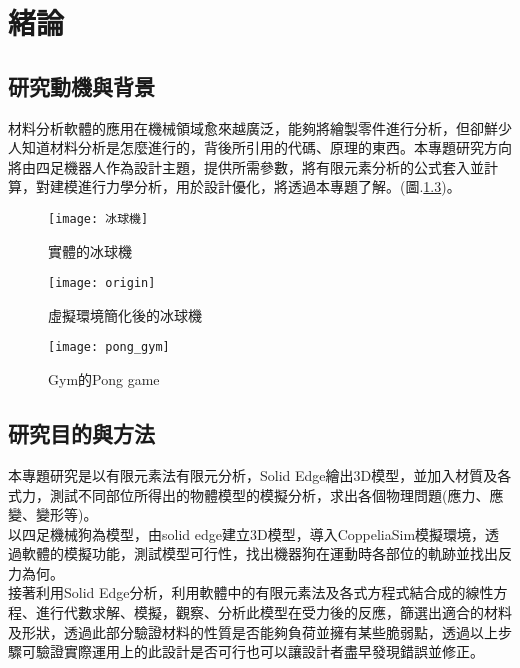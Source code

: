 \chapter{緒論}
\renewcommand{\baselinestretch}{10.0} %
\setcounter{page}{1}  %
\fontsize{14pt}{2.5pt}\sectionef
\section{研究動機與背景}
材料分析軟體的應用在機械領域愈來越廣泛，能夠將繪製零件進行分析，但卻鮮少人知道材料分析是怎麼進行的，背後所引用的代碼、原理的東西。本專題研究方向將由四足機器人作為設計主題，提供所需參數，將有限元素分析的公式套入並計算，對建模進行力學分析，用於設計優化，將透過本專題了解。(圖.\ref{fig.pong_gym})。\\

\begin{figure}[hbt!]
\begin{center}
\texttt{[image: 冰球機]}
\caption{\Large 實體的冰球機}\label{fig.冰球機}
\end{center}
\end{figure}
\begin{figure}[hbt!]
\begin{center}
\texttt{[image: origin]}
\caption{\Large 虛擬環境簡化後的冰球機}\label{fig.模擬冰球機}
\end{center}
\end{figure}
\begin{figure}[hbt!]
\begin{center}
\texttt{[image: pong\_gym]}
\caption{\Large Gym的Pong game}\label{fig.pong_gym}
\end{center}
\end{figure}


\section{研究目的與方法}
本專題研究是以有限元素法有限元分析，Solid Edge繪出3D模型，並加入材質及各式力，測試不同部位所得出的物體模型的模擬分析，求出各個物理問題(應力、應變、變形等)。\\

以四足機械狗為模型，由solid edge建立3D模型，導入CoppeliaSim模擬環境，透過軟體的模擬功能，測試模型可行性，找出機器狗在運動時各部位的軌跡並找出反力為何。\\

接著利用Solid Edge分析，利用軟體中的有限元素法及各式方程式結合成的線性方程、進行代數求解、模擬，觀察、分析此模型在受力後的反應，篩選出適合的材料及形狀，透過此部分驗證材料的性質是否能夠負荷並擁有某些脆弱點，透過以上步驟可驗證實際運用上的此設計是否可行也可以讓設計者盡早發現錯誤並修正。\\
 

